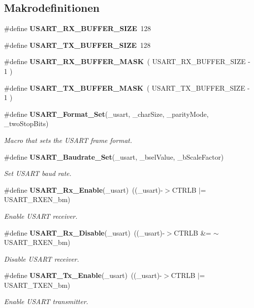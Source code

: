 \subsection*{Makrodefinitionen}
\begin{DoxyCompactItemize}
\item 
\#define {\bf USART\_\-RX\_\-BUFFER\_\-SIZE}~128
\item 
\#define {\bf USART\_\-TX\_\-BUFFER\_\-SIZE}~128
\item 
\#define {\bf USART\_\-RX\_\-BUFFER\_\-MASK}~( USART\_\-RX\_\-BUFFER\_\-SIZE -\/ 1 )
\item 
\#define {\bf USART\_\-TX\_\-BUFFER\_\-MASK}~( USART\_\-TX\_\-BUFFER\_\-SIZE -\/ 1 )
\item 
\#define {\bf USART\_\-Format\_\-Set}(\_\-usart, \_\-charSize, \_\-parityMode, \_\-twoStopBits)
\begin{DoxyCompactList}\small\item\em Macro that sets the USART frame format. \item\end{DoxyCompactList}\item 
\#define {\bf USART\_\-Baudrate\_\-Set}(\_\-usart, \_\-bselValue, \_\-bScaleFactor)
\begin{DoxyCompactList}\small\item\em Set USART baud rate. \item\end{DoxyCompactList}\item 
\#define {\bf USART\_\-Rx\_\-Enable}(\_\-usart)~((\_\-usart)-\/$>$CTRLB $|$= USART\_\-RXEN\_\-bm)
\begin{DoxyCompactList}\small\item\em Enable USART receiver. \item\end{DoxyCompactList}\item 
\#define {\bf USART\_\-Rx\_\-Disable}(\_\-usart)~((\_\-usart)-\/$>$CTRLB \&= $\sim$USART\_\-RXEN\_\-bm)
\begin{DoxyCompactList}\small\item\em Disable USART receiver. \item\end{DoxyCompactList}\item 
\#define {\bf USART\_\-Tx\_\-Enable}(\_\-usart)~((\_\-usart)-\/$>$CTRLB $|$= USART\_\-TXEN\_\-bm)
\begin{DoxyCompactList}\small\item\em Enable USART transmitter. \item\end{DoxyCompactList}\item 

\end{DoxyCompactItemize}
